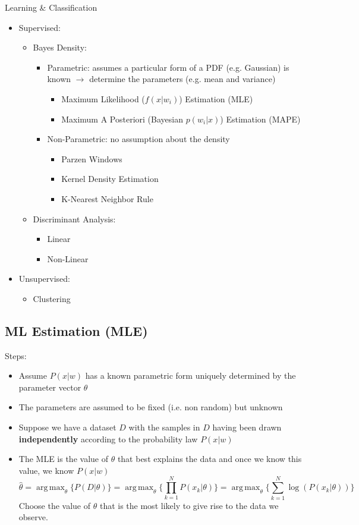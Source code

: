 \documentclass[letterpaper,10pt]{article}
\DeclareMathOperator*{\argmax}{arg\,max}
\begin{document}
Learning \& Classification
\begin{itemize}
	\item Supervised:
	\begin{itemize}
		\item Bayes Density:
		\begin{itemize}
			\item Parametric: assumes a particular form of a PDF (e.g. Gaussian) is known $\rightarrow$ determine the parameters (e.g. mean and variance)
			\begin{itemize}
				\item Maximum Likelihood ($f(x|w_i)$) Estimation (MLE)
				\item Maximum A Posteriori (Bayesian $p(w_i|x)$) Estimation (MAPE)
			\end{itemize}
			\item Non-Parametric: no assumption about the density
			\begin{itemize}
				\item Parzen Windows
				\item Kernel Density Estimation
				\item K-Nearest Neighbor Rule
			\end{itemize}
		\end{itemize}
		\item Discriminant Analysis:
		\begin{itemize}
			\item Linear
			\item Non-Linear
		\end{itemize}
	\end{itemize}
	\item Unsupervised:
	\begin{itemize}
		\item Clustering
	\end{itemize}
\end{itemize}

\subsection{ML Estimation (MLE)}
Steps:
\begin{itemize}
	\item Assume $P(x|w)$ has a known parametric form uniquely determined by the parameter vector $\theta$
	\item The parameters are assumed to be fixed (i.e. non random) but unknown
	\item Suppose we have a dataset $D$ with the samples in $D$ having been drawn \textbf{independently} according to the probability law $P(x|w)$
	\item The MLE is the value of $\theta$ that best explains the data and once we know this value, we know $P(x|w)$
	\begin{equation}
	\hat{\theta}=\argmax_\theta\{P(D|\theta)\}=\argmax_\theta\{\prod_{k=1}^{N}{P(x_k|\theta)}\}=\argmax_\theta\{\sum_{k=1}^{N}{\log(P(x_k|\theta))}\}
	\end{equation}
	Choose the value of $\theta$ that is the most likely to give rise to the data we observe.
\end{itemize}
\end{document}
